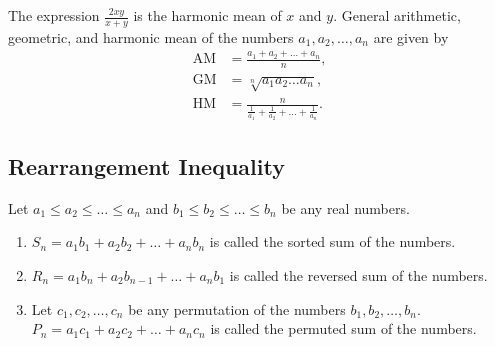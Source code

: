 \documentclass[../main.tex]{subfiles}
\begin{document}
The expression $\frac{2xy}{x + y}$ is the \textsf{harmonic mean} of $x$ and $y$.
General arithmetic, geometric, and harmonic mean of the numbers $a_1, a_2, \dots, a_n$ are given by
\begin{align*}
    \mathrm{AM} &= \frac{a_1 + a_2 + \dots + a_n}{n},\\
    \mathrm{GM} &= \sqrt[n]{a_1 a_2 \dots a_n},\\
    \mathrm{HM} &= \frac{n}{\frac{1}{a_1} + \frac{1}{a_2} + \dots + \frac{1}{a_n}}.
\end{align*}

\subsection{Rearrangement Inequality}
\begin{defn}
    Let $a_1 \leq a_2 \leq \dots \leq a_n$ and $b_1 \leq b_2 \leq \dots \leq b_n$ be any real numbers.
    \begin{enumerate}
        \item $S_n = a_1 b_1 + a_2 b_2 + \dots + a_n b_n$ is called the \textsf{sorted sum} of the numbers.
        \item $R_n = a_1 b_n + a_2 b_{n-1} + \dots + a_n b_1$ is called the \textsf{reversed sum} of the numbers.
        \item Let $c_1, c_2, \dots, c_n$ be any permutation of the numbers $b_1, b_2, \dots, b_n$.\\
            $P_n = a_1 c_1 + a_2 c_2 + \dots + a_n c_n$ is called the \textsf{permuted sum} of the numbers.
    \end{enumerate}
\end{defn}
\end{document}
